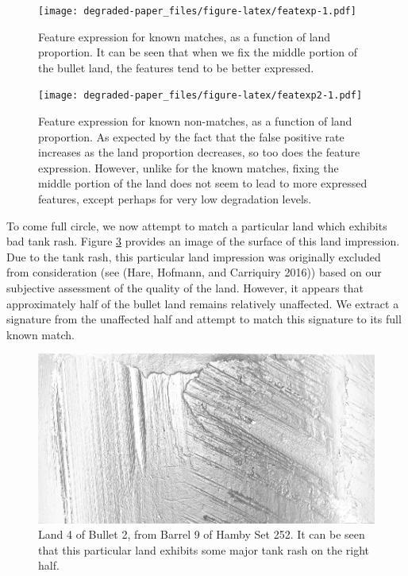 \documentclass[12pt,]{article}
\theoremstyle{definition}
\theoremstyle{definition}
\theoremstyle{definition}
\theoremstyle{remark}
\begin{document}
\begin{figure}[htbp]
\centering
\texttt{[image: degraded-paper\_files/figure-latex/featexp-1.pdf]}
\caption{\label{fig:featexp}Feature expression for known matches, as a
function of land proportion. It can be seen that when we fix the middle
portion of the bullet land, the features tend to be better expressed.}
\end{figure}

\begin{figure}[htbp]
\centering
\texttt{[image: degraded-paper\_files/figure-latex/featexp2-1.pdf]}
\caption{\label{fig:featexp2}Feature expression for known non-matches, as a
function of land proportion. As expected by the fact that the false
positive rate increases as the land proportion decreases, so too does
the feature expression. However, unlike for the known matches, fixing
the middle portion of the land does not seem to lead to more expressed
features, except perhaps for very low degradation levels.}
\end{figure}

To come full circle, we now attempt to match a particular land which
exhibits bad tank rash. Figure \ref{fig:br924} provides an image of the
surface of this land impression. Due to the tank rash, this particular
land impression was originally excluded from consideration (see (Hare,
Hofmann, and Carriquiry 2016)) based on our subjective assessment of the
quality of the land. However, it appears that approximately half of the
bullet land remains relatively unaffected. We extract a signature from
the unaffected half and attempt to match this signature to its full
known match.

\begin{figure}[H]
\centering
\includegraphics[width=\linewidth]{images/br9-2-4-greyflip.png}
\caption{Land 4 of Bullet 2, from Barrel 9 of Hamby Set 252. It can be seen that this particular land exhibits some major tank rash on the right half.}
\label{fig:br924}
\end{figure}
\end{document}

